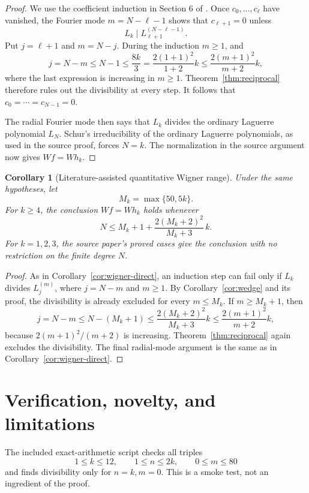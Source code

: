 \documentclass[11pt]{article}
\newtheorem{corollary}[theorem]{Corollary}
\theoremstyle{remark}
\begin{document}
\begin{proof}
We use the coefficient induction in Section 6 of \cite{ACDP}.  Once
$c_0,\ldots,c_\ell$ have vanished, the Fourier mode
$m=N-\ell-1$ shows that $c_{\ell+1}=0$ unless
\[
 L_k\mid L_{\ell+1}^{(N-\ell-1)}.
\]
Put $j=\ell+1$ and $m=N-j$.  During the induction $m\geq1$, and
\[
 j=N-m\leq N-1\leq\frac{8k}{3}
             =\frac{2(1+1)^2}{1+2}k
             \leq\frac{2(m+1)^2}{m+2}k,
\]
where the last expression is increasing in $m\geq1$.
Theorem~\ref{thm:reciprocal} therefore rules out the divisibility at every
step.
It follows that $c_0=\cdots=c_{N-1}=0$.

The radial Fourier mode then says that $L_k$ divides the ordinary Laguerre
polynomial $L_N$.  Schur's irreducibility of the ordinary Laguerre
polynomials, as used in the source proof, forces $N=k$.  The normalization
in the source argument now gives $Wf=Wh_k$.
\end{proof}

\begin{corollary}[Literature-assisted quantitative Wigner range]
\label{cor:wigner-large}
Under the same hypotheses, let
\[
 M_k=\max\{50,5k\}.
\]
For $k\geq4$, the conclusion $Wf=Wh_k$ holds whenever
\begin{equation}\label{eq:wigner-large}
 N\leq M_k+1+\frac{2(M_k+2)^2}{M_k+3}\,k.
\end{equation}
For $k=1,2,3$, the source paper's proved cases give the conclusion with no
restriction on the finite degree $N$.
\end{corollary}

\begin{proof}
As in Corollary~\ref{cor:wigner-direct}, an induction step can fail only if
$L_k$ divides $L_j^{(m)}$, where $j=N-m$ and $m\geq1$.
By Corollary~\ref{cor:wedge} and its proof, the divisibility is already
excluded for every $m\leq M_k$.  If $m\geq M_k+1$, then
\[
 j=N-m\leq N-(M_k+1)
   \leq\frac{2(M_k+2)^2}{M_k+3}k
   \leq\frac{2(m+1)^2}{m+2}k,
\]
because $2(m+1)^2/(m+2)$ is increasing.  Theorem~\ref{thm:reciprocal}
again excludes the divisibility.  The final radial-mode argument is the
same as in Corollary~\ref{cor:wigner-direct}.
\end{proof}

\section{Verification, novelty, and limitations}

The included exact-arithmetic script checks all triples
\[
 1\leq k\leq12,\qquad 1\leq n\leq2k,\qquad0\leq m\leq80
\]
and finds divisibility only for $n=k,m=0$.  This is a smoke test, not an
ingredient of the proof.
\end{document}
